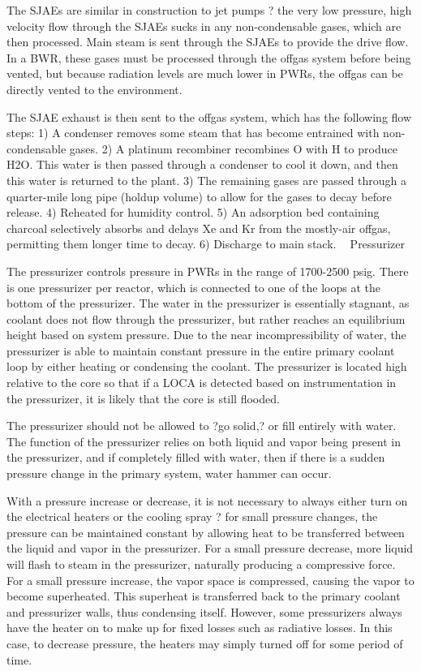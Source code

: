 \documentclass[10pt]{article}
\begin{document}
The SJAEs are similar in construction to jet pumps ? the very low pressure, high velocity flow through the SJAEs sucks in any non-condensable gases, which are then processed. Main steam is sent through the SJAEs to provide the drive flow. In a BWR, these gases must be processed through the offgas system before being vented, but because radiation levels are much lower in PWRs, the offgas can be directly vented to the environment. 

The SJAE exhaust is then sent to the offgas system, which has the following flow steps:
1)	A condenser removes some steam that has become entrained with non-condensable gases. 
2)	A platinum recombiner recombines O with H to produce H2O. This water is then passed through a condenser to cool it down, and then this water is returned to the plant. 
3)	The remaining gases are passed through a quarter-mile long pipe (holdup volume) to allow for the gases to decay before release. 
4)	Reheated for humidity control.
5)	An adsorption bed containing charcoal selectively absorbs and delays Xe and Kr from the mostly-air offgas, permitting them longer time to decay. 
6)	Discharge to main stack.

Pressurizer

The pressurizer controls pressure in PWRs in the range of 1700-2500 psig. There is one pressurizer per reactor, which is connected to one of the loops at the bottom of the pressurizer. The water in the pressurizer is essentially stagnant, as coolant does not flow through the pressurizer, but rather reaches an equilibrium height based on system pressure. Due to the near incompressibility of water, the pressurizer is able to maintain constant pressure in the entire primary coolant loop by either heating or condensing the coolant. The pressurizer is located high relative to the core so that if a LOCA is detected based on instrumentation in the pressurizer, it is likely that the core is still flooded.

The pressurizer should not be allowed to ?go solid,? or fill entirely with water. The function of the pressurizer relies on both liquid and vapor being present in the pressurizer, and if completely filled with water, then if there is a sudden pressure change in the primary system, water hammer can occur. 

With a pressure increase or decrease, it is not necessary to always either turn on the electrical heaters or the cooling spray ? for small pressure changes, the pressure can be maintained constant by allowing heat to be transferred between the liquid and vapor in the pressurizer. For a small pressure decrease, more liquid will flash to steam in the pressurizer, naturally producing a compressive force. For a small pressure increase, the vapor space is compressed, causing the vapor to become superheated. This superheat is transferred back to the primary coolant and pressurizer walls, thus condensing itself. However, some pressurizers always have the heater on to make up for fixed losses such as radiative losses. In this case, to decrease pressure, the heaters may simply turned off for some period of time. 
\end{document}
